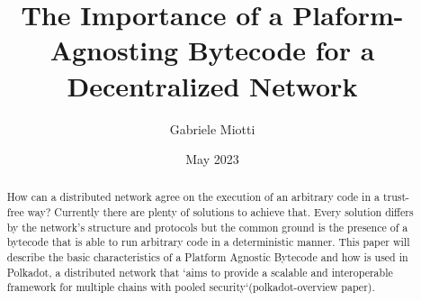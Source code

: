 \documentclass{article}
\title{The Importance of a Plaform-Agnosting Bytecode for a Decentralized Network}
\author{Gabriele Miotti}
\date{May 2023}
\begin{document}
\maketitle

\begin{abstract}

How can a distributed network agree on the execution of an arbitrary code in a trust-free way? Currently there are plenty of solutions to achieve that. Every solution differs by the network's structure and protocols but the common ground is the presence of a bytecode that is able to run arbitrary code in a deterministic manner. This paper will describe the basic characteristics of a Platform Agnostic Bytecode and how is used in Polkadot, a distributed network that `aims to provide a scalable and interoperable framework for multiple chains with pooled security`(polkadot-overview paper).

\end{abstract}

{
  \hypersetup{linkcolor=black}
  \tableofcontents
}












\end{document}
